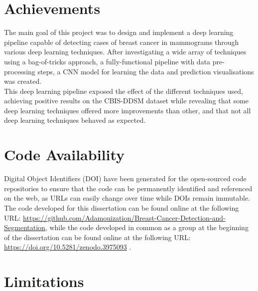 \section{Achievements}

The main goal of this project was to design and implement a deep learning pipeline capable of detecting cases of breast cancer in mammograms through various deep learning techniques. After investigating a wide array of techniques using a bag-of-tricks approach, a fully-functional pipeline with data pre-processing steps, a CNN model for learning the data and prediction visualisations was created.\\

This deep learning pipeline exposed the effect of the different techniques used, achieving  positive results on the CBIS-DDSM dataset while revealing that some deep learning techniques offered more improvements than other, and that not all deep learning techniques behaved as expected.


\section{Code Availability}

Digital Object Identifiers (DOI) have been generated for the open-sourced code repositories to ensure that the code can be permanently identified and referenced on the web, as URLs can easily change over time while DOIs remain immutable.\\

The code developed for this dissertation can be found online at the following URL: \url{https://github.com/Adamouization/Breast-Cancer-Detection-and-Segmentation}, while the code developed in common as a group at the beginning of the dissertation can be found online at the following URL: \url{https://doi.org/10.5281/zenodo.3975093} \citep{adam_jaamour_2020_3975093}.


\section{Limitations}
\label{sec:conclusions-limitations}

